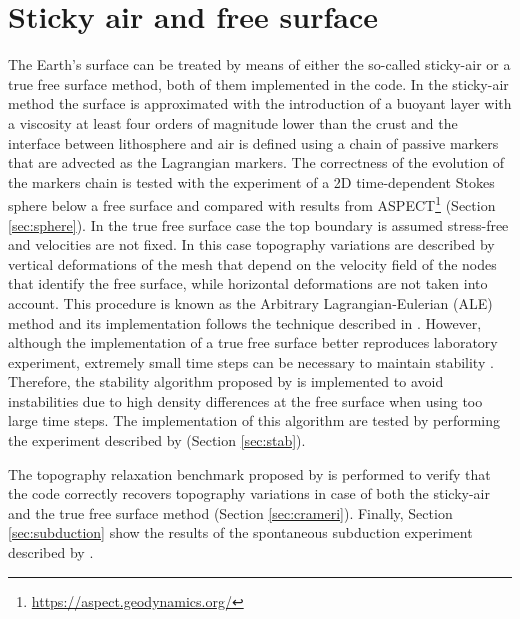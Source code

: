 \documentclass[hidelinks,10pt,a4paper]{article}
\begin{document}
\section{Sticky air and free surface}\label{sec:sticky}
The Earth's surface can be treated by means of either the so-called sticky-air or a true free surface method, both of them implemented in the code. In the
sticky-air method the surface is approximated with the introduction of a buoyant layer with a viscosity at least four orders of magnitude lower than the crust
\citep{Schmeling2008,Crameri2012} and the interface between lithosphere and air is defined using a chain of passive markers that are advected as the Lagrangian
markers. The correctness of the evolution of the markers chain is tested with the experiment of a 2D time-dependent Stokes sphere below a free surface and
compared with results from ASPECT\footnote{\url{https://aspect.geodynamics.org/}} \citep{KHB12,heister_aspect_methods2,aspect-doi-v2.2.0,aspectmanual} (Section
\ref{sec:sphere}). In the true free surface case the top boundary is assumed stress-free and velocities are not fixed. In this case topography variations are
described by vertical deformations of the mesh that depend on the velocity field of the nodes that identify the free surface, while horizontal deformations are
not taken into account. This procedure is known as the Arbitrary Lagrangian-Eulerian (ALE) method and its implementation follows the technique described in
\citet{Thieulot2011}. However, although the implementation of a true free surface better reproduces laboratory experiment, extremely small time steps can be
necessary to maintain stability \citep{Kaus2010a,Quinquis2011,Thieulot2014}. Therefore, the stability algorithm proposed by \citet{Kaus2010a} is implemented
to avoid instabilities due to high density differences at the free surface when using too large time steps. The implementation of this algorithm are tested by
performing the experiment described by \citet{Kaus2010a} (Section \ref{sec:stab}).

The topography relaxation benchmark proposed by \citet{Crameri2012} is performed to verify that the code correctly recovers topography variations in case of
both the sticky-air and the true free surface method (Section \ref{sec:crameri}). Finally, Section \ref{sec:subduction} show the results of the spontaneous
subduction experiment described by \citet{Schmeling2008}.
\end{document}
